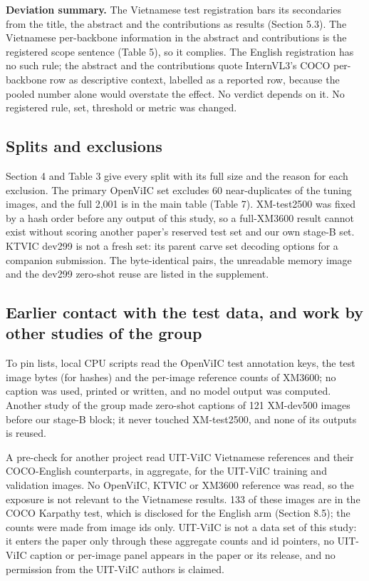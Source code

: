 \textbf{Deviation summary.} The Vietnamese test registration bars its secondaries from the title,
the abstract and the contributions as results (Section 5.3). The Vietnamese per-backbone information
in the abstract and contributions is the registered scope sentence (Table 5), so it complies. The
English registration has no such rule; the abstract and the contributions quote InternVL3's COCO
per-backbone row as descriptive context, labelled as a reported row, because the pooled number alone
would overstate the effect. No verdict depends on it. No registered rule, set, threshold or metric
was changed.

\subsection{Splits and exclusions}\label{splits-and-exclusions}

Section 4 and Table 3 give every split with its full size and the reason for each exclusion. The
primary OpenViIC set excludes 60 near-duplicates of the tuning images, and the full 2,001 is in the
main table (Table 7). XM-test2500 was fixed by a hash order before any output of this study, so a
full-XM3600 result cannot exist without scoring another paper's reserved test set and our own
stage-B set. KTVIC dev299 is not a fresh set: its parent carve set decoding options for a companion
submission. The byte-identical pairs, the unreadable memory image and the dev299 zero-shot reuse are
listed in the supplement.

\subsection{Earlier contact with the test data, and work by other studies of the
group}\label{earlier-contact-with-the-test-data-and-work-by-other-studies-of-the-group}

To pin lists, local CPU scripts read the OpenViIC test annotation keys, the test image bytes (for
hashes) and the per-image reference counts of XM3600; no caption was used, printed or written, and
no model output was computed. Another study of the group made zero-shot captions of 121 XM-dev500
images before our stage-B block; it never touched XM-test2500, and none of its outputs is reused.

A pre-check for another project read UIT-ViIC Vietnamese references and their COCO-English
counterparts, in aggregate, for the UIT-ViIC training and validation images. No OpenViIC, KTVIC or
XM3600 reference was read, so the exposure is not relevant to the Vietnamese results. 133 of these
images are in the COCO Karpathy test, which is disclosed for the English arm (Section 8.5); the
counts were made from image ids only. UIT-ViIC is not a data set of this study: it enters the paper
only through these aggregate counts and id pointers, no UIT-ViIC caption or per-image panel appears
in the paper or its release, and no permission from the UIT-ViIC authors is claimed.

